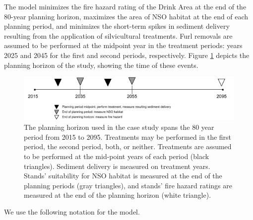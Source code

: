 The model minimizes the fire hazard rating of the Drink Area at the end of the 80-year planning horizon, maximizes the area of NSO habitat at the end of each planning period, and minimizes the short-term spikes in sediment delivery resulting from the application of silvicultural treatments. Furl removals are assumed to be performed at the midpoint year in the treatment periods: years 2025 and 2045 for the first and second periods, respectively. Figure \ref{fig:drinkPlanningHorizon} depicts the planning horizon of the study, showing the time of these events.

\begin{figure}
\centering
\includegraphics[width=.85\textwidth]{../images/Drink_PlanningHorizon_Sketch}
\caption[Planning horizon for the case study]{The planning horizon used in the case study spans the 80 year period from 2015 to 2095. Treatments may be performed in the first period, the second period, both, or neither. Treatments are assumed to be performed at the mid-point years of each period (black triangles). Sediment delivery is measured on treatment years. Stands' suitability for NSO habitat is measured at the end of the planning periods (gray triangles), and stands' fire hazard ratings are measured at the end of the planning horizon (white triangle).}
\label{fig:drinkPlanningHorizon}
\end{figure}

We use the following notation for the model.

